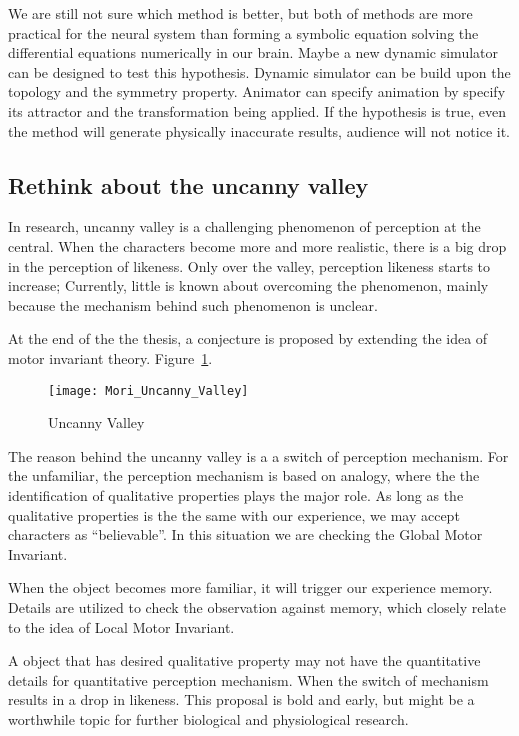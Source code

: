 We are still not sure which method is better, but both of methods are more practical for the neural system than forming a symbolic equation solving the differential equations numerically in our brain.
Maybe a new dynamic simulator can be designed to test this hypothesis.
Dynamic simulator can be build upon the topology and the symmetry property.
Animator can specify animation by specify its attractor and the transformation being  applied.
If the hypothesis is true, even the method will generate physically inaccurate results, audience will not notice it.

\subsection{Rethink about the uncanny valley}
In \cms research, uncanny valley is a challenging phenomenon of perception at the  central. 
When the characters  become more and more realistic, there is a big drop in the perception of likeness.
Only over the valley, perception likeness starts to increase;
Currently, little is known about overcoming the phenomenon,
mainly because the mechanism behind such phenomenon is unclear.

At the end of the the thesis, a conjecture is proposed by extending the idea of motor invariant theory.
Figure~\ref{fig:uncannyValley}.

\begin{figure}[!htbp]
  \begin{center}
      \texttt{[image: Mori\_Uncanny\_Valley]}
    \caption{Uncanny Valley}
    \label{fig:uncannyValley}
\end{center}
\end{figure}

The reason behind the uncanny valley is a  a switch of perception mechanism.
For the unfamiliar, the perception mechanism is based on analogy,
where the the identification of qualitative properties plays the major role.
As long as the qualitative properties is the the same with our experience, we may accept characters as ``believable''.
In this situation we are checking the Global Motor Invariant.

When the object becomes more familiar, it will trigger our experience memory.
Details are utilized to check the observation against memory,
which closely relate to the idea of Local Motor Invariant.


A object that has desired qualitative property may not have the quantitative details for quantitative perception mechanism.
When the switch of mechanism results in a drop in likeness.
This proposal is bold and early, but might be a worthwhile topic for further biological and physiological research.







